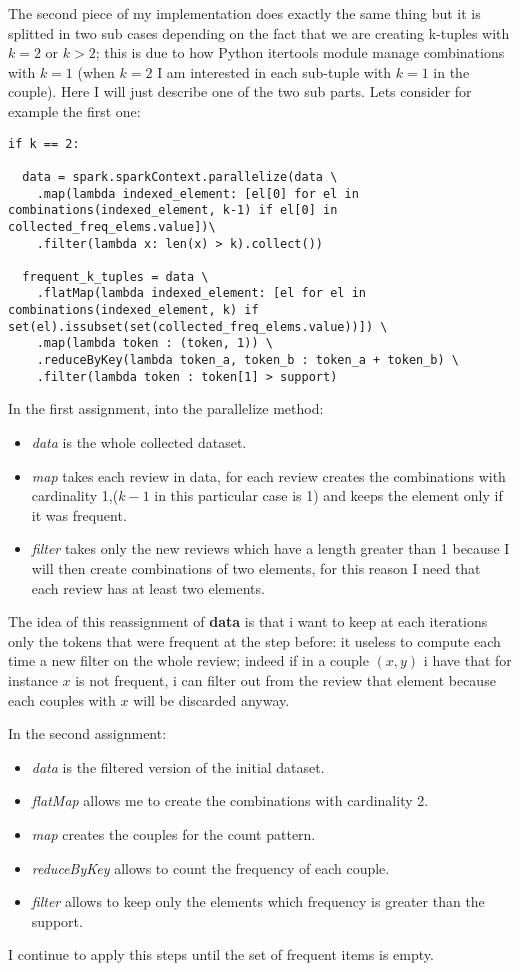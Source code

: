 The second piece of my implementation does exactly the same thing but it is splitted in two sub cases depending on the fact that we are creating k-tuples with $k=2$ or $k>2$; this is due to how Python itertools module manage combinations with $k=1$ (when $k=2$ I am interested in each sub-tuple with $k=1$ in the couple). Here I will just describe one of the two sub parts. Lets consider for example the first one:
\begin{lstlisting}
if k == 2:

  data = spark.sparkContext.parallelize(data \
    .map(lambda indexed_element: [el[0] for el in combinations(indexed_element, k-1) if el[0] in collected_freq_elems.value])\
    .filter(lambda x: len(x) > k).collect())

  frequent_k_tuples = data \
    .flatMap(lambda indexed_element: [el for el in combinations(indexed_element, k) if set(el).issubset(set(collected_freq_elems.value))]) \
    .map(lambda token : (token, 1)) \
    .reduceByKey(lambda token_a, token_b : token_a + token_b) \
    .filter(lambda token : token[1] > support)
\end{lstlisting}

In the first assignment, into the parallelize method:
\begin{itemize}
  \item \textit{data} is the whole collected dataset.
  \item \textit{map} takes each review in data, for each review creates the combinations with cardinality 1,($k-1$ in this particular case is 1) and keeps the element only if it was frequent.
  \item \textit{filter} takes only the new reviews which have a length greater than 1 because I will then create combinations of two elements, for this reason I need that each review has at least two elements. 
\end{itemize}

The idea of this reassignment of \textbf{data} is that i want to keep at each iterations only the tokens that were frequent at the step before: it useless to compute each time a new filter on the whole review; indeed if in a couple $(x,y)$ i have that for instance $x$ is not frequent, i can filter out from the review that element because each couples with $x$ will be discarded anyway.

In the second assignment:
\begin{itemize}
  \item \textit{data} is the filtered version of the initial dataset.
  \item \textit{flatMap} allows me to create the combinations with cardinality 2.
  \item \textit{map} creates the couples for the count pattern.
  \item \textit{reduceByKey} allows to count the frequency of each couple.
  \item \textit{filter} allows to keep only the elements which frequency is greater than the support.
\end{itemize}

I continue to apply this steps until the set of frequent items is empty.